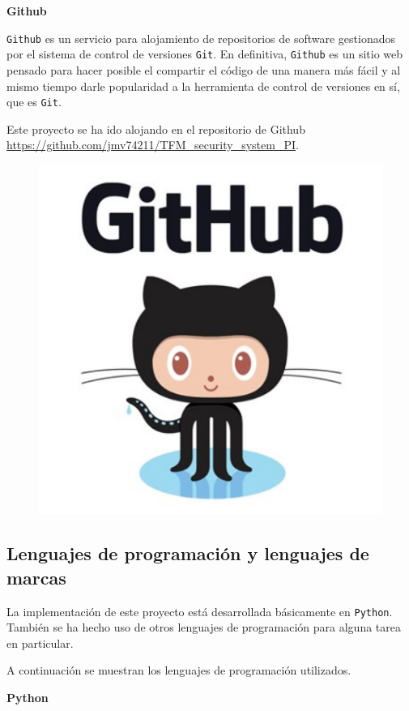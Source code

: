 \textbf{Github}

\texttt{Github} \cite{ref11} es un servicio para alojamiento de repositorios de software gestionados por el sistema de control de versiones \texttt{Git}. En definitiva, \texttt{Github} es un sitio web pensado para hacer posible el compartir el código de una manera más fácil y al mismo tiempo darle popularidad a la herramienta de control de versiones en sí, que es \texttt{Git}.

Este proyecto se ha ido alojando en el repositorio de Github \url{https://github.com/jmv74211/TFM_security_system_PI}.

\begin{figure}[h]
	\centering
	\includegraphics[scale=0.2]{images/7}
\end{figure}

\subsection{Lenguajes de programación y lenguajes de marcas}

La implementación de este proyecto está desarrollada básicamente en \texttt{Python}. También se ha hecho uso de otros lenguajes de programación para alguna tarea en particular.

A continuación se muestran los lenguajes de programación utilizados.

\textbf{Python}

